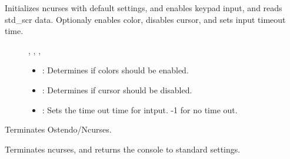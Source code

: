 \documentclass[letterpaper,10pt,english]{sphinxmanual}
\begin{document}
\begin{fulllineitems}
\begin{fulllineitems}
Initializes ncurses with default settings, and enables keypad input, and reads std\_scr data. Optionaly enables color, disables cursor, and sets input timeout time. \begin{description}
\item[{}] \leavevmode
{\hyperref[\detokenize{index:Pessumnamespaceostendo_1a4c5850c8a109e159e874ecce8a5dc62a}]{}}, {\hyperref[\detokenize{index:Pessumnamespaceostendo_1ab45e3689aa0cb8a2e3a175c0aed97880}]{}}, {\hyperref[\detokenize{index:Pessumnamespaceostendo_1aaece4e9a0bcd75df4724bf97c628c12e}]{}}, {\hyperref[\detokenize{index:Pessumnamespaceostendo_1ae151d449ffec660866ee7c8ac75892da}]{}} 

\item[{}] \leavevmode\begin{itemize}
\item {} 
: Determines if colors should be enabled. 

\item {} 
: Determines if cursor should be disabled. 

\item {} 
: Sets the time out time for intput. -1 for no time out. 

\end{itemize}

\end{description}


\end{fulllineitems}


\begin{fulllineitems}
\label{\detokenize{index:_CPPv2N7ostendo11TermOstendoEv}}%
\pysigstartmultiline
{}\label{\detokenize{index:Pessumnamespaceostendo_1ae151d449ffec660866ee7c8ac75892da}}%
\pysigstopmultiline
Terminates Ostendo/Ncurses. 

Terminates ncurses, and returns the console to standard settings. \begin{description}
\item[{}] \leavevmode
{\hyperref[\detokenize{index:Pessumnamespaceostendo_1acada6eef78aaae2a103761e6b3122a7c}]{}} 


\end{description}
\end{fulllineitems}
\end{fulllineitems}
\end{document}
